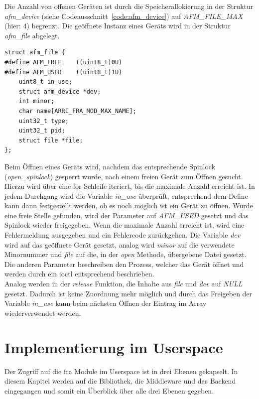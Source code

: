 Die Anzahl von offenen Geräten ist durch die Speicherallokierung in der Struktur \textit{afm\_device} (siehe Codeausschnitt~\ref{code:afm_device}) auf \textit{AFM\_FILE\_MAX} (hier: 4) begrenzt. Die geöffnete Instanz eines Geräts wird in der Struktur \textit{afm\_file} abgelegt.

\begin{lstfloat}
\begin{lstlisting}
struct afm_file {  
#define AFM_FREE    ((uint8_t)0U)
#define AFM_USED    ((uint8_t)1U)
	uint8_t in_use;
	struct afm_device *dev;
	int minor;
	char name[ARRI_FRA_MOD_MAX_NAME];
	uint32_t type;
	uint32_t pid;
	struct file *file;
};
\end{lstlisting}
\end{lstfloat}

Beim Öffnen eines Geräts wird, nachdem das entsprechende Spinlock (\textit{open\_spinlock}) gesperrt wurde, nach einem freien Gerät zum Öffnen gesucht. Hierzu wird über eine for-Schleife iteriert, bis die maximale Anzahl erreicht ist. In jedem Durchgang wird die Variable \textit{in\_use} überprüft, entsprechend dem Define kann dann festgestellt werden, ob es noch möglich ist ein Gerät zu öffnen. Wurde eine freie Stelle gefunden, wird der Parameter auf \textit{AFM\_USED} gesetzt und das Spinlock wieder freigegeben.
Wenn die maximale Anzahl erreicht ist, wird eine Fehlermeldung ausgegeben und ein Fehlercode zurückgehen.
Die Variable \textit{dev} wird auf das geöffnete Gerät gesetzt, analog wird \textit{minor} auf die verwendete Minornummer und \textit{file} auf die, in der \textit{open} Methode, übergebene Datei gesetzt. 
Die anderen Parameter beschreiben den Prozess, welcher das Gerät öffnet und werden durch ein \ac{ioctl} entsprechend beschrieben.\\

Analog werden in der \textit{release} Funktion, die Inhalte aus \textit{file} und \textit{dev} auf \textit{NULL} gesetzt. Dadurch ist keine Zuordnung mehr möglich und durch das Freigeben der Variable \textit{in\_use} kann beim nächsten Öffnen der Eintrag im Array wiederverwendet werden.


\section{Implementierung im Userspace}\label{sec:user}
Der Zugriff auf die \ac{fra} Module im Userspace ist in drei Ebenen gekapselt. In diesem Kapitel werden auf die Bibliothek, die Middleware und das Backend eingegangen und somit ein Überblick über alle drei Ebenen gegeben.

